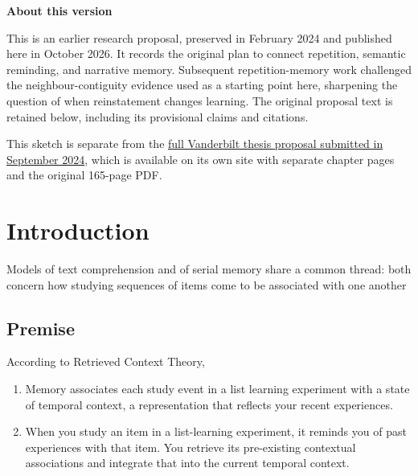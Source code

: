 \documentclass[
  english,
  11pt,
  letterpaper,
]{article}
\providecommand{\tightlist}{%
  \setlength{\itemsep}{0pt}\setlength{\parskip}{0pt}}
\begin{document}
\begin{tcolorbox}[enhanced jigsaw, bottomrule=.15mm, breakable, toprule=.15mm, colframe=quarto-callout-note-color-frame, arc=.35mm, colback=white, rightrule=.15mm, opacityback=0, left=2mm, leftrule=.75mm]

\vspace{-3mm}\textbf{About this version}\vspace{3mm}

This is an earlier research proposal, preserved in February 2024 and
published here in October 2026. It records the original plan to connect
repetition, semantic reminding, and narrative memory. Subsequent
repetition-memory work challenged the neighbour-contiguity evidence used
as a starting point here, sharpening the question of when reinstatement
changes learning. The original proposal text is retained below,
including its provisional claims and citations.

This sketch is separate from the
\href{https://githubpsyche.github.io/vanderbilt-thesis-proposal-2024/}{full
Vanderbilt thesis proposal submitted in September 2024}, which is
available on its own site with separate chapter pages and the original
165-page PDF.

\end{tcolorbox}

\section{Introduction}\label{introduction}

Models of text comprehension and of serial memory share a common thread:
both concern how studying sequences of items come to be associated with
one another


\subsection{Premise}\label{premise}

According to Retrieved Context Theory,

\begin{enumerate}
\def\labelenumi{\arabic{enumi}.}
\tightlist
\item
  Memory associates each study event in a list learning experiment with
  a state of temporal context, a representation that reflects your
  recent experiences.
\item
  When you study an item in a list-learning experiment, it reminds you
  of past experiences with that item. You retrieve its pre-existing
  contextual associations and integrate that into the current temporal
  context.
\end{enumerate}
\end{document}
